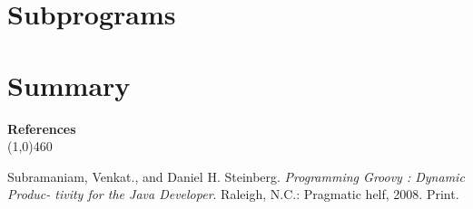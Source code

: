 \documentclass[12pt]{article}
\begin{document}
\section*{\fontsize{14}{15}\selectfont Subprograms}

\section*{\fontsize{14}{15}\selectfont Summary}



\newpage
\begin{center}
    {\bf \large\fontsize{15}{15} \selectfont References} \\
    \line(1,0){460}
\end{center}

\vspace{0.5cm}

\noindent Subramaniam, Venkat., and Daniel H. Steinberg. \textit{Programming Groovy : Dynamic Produc- \indent tivity for the Java Developer}. Raleigh, N.C.: Pragmatic helf, 2008. Print.
\\
\end{document}
